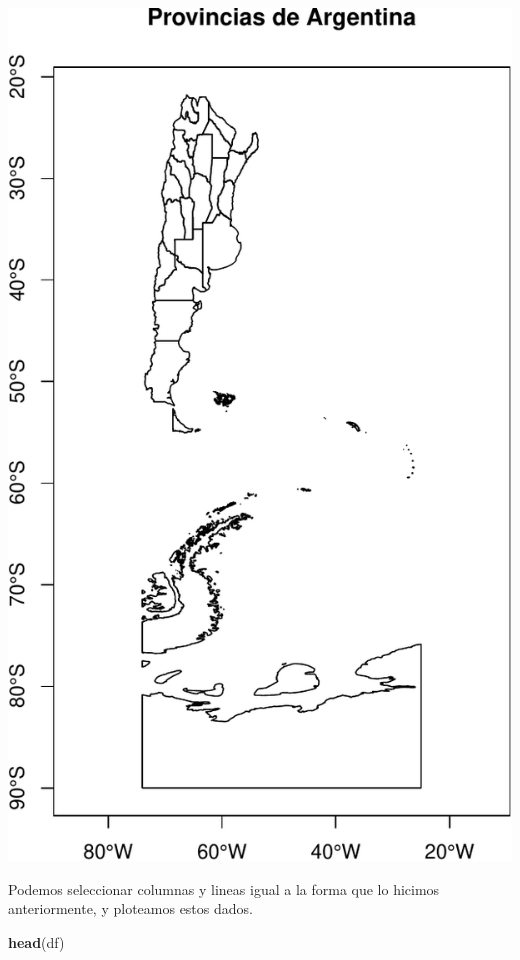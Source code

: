 \documentclass[]{book}
\newenvironment{Shaded}{\begin{snugshade}}{\end{snugshade}}
\newcommand{\KeywordTok}[1]{\textcolor[rgb]{0.13,0.29,0.53}{\textbf{#1}}}
\newcommand{\NormalTok}[1]{#1}
\begin{document}
\includegraphics{bookdown-demo_files/figure-latex/unnamed-chunk-42-1.pdf}

Podemos seleccionar columnas y lineas igual a la forma que lo hicimos anteriormente, y ploteamos estos dados.

\begin{Shaded}
\begin{Highlighting}[]
\KeywordTok{head}\NormalTok{(df)}
\end{Highlighting}
\end{Shaded}
\end{document}
